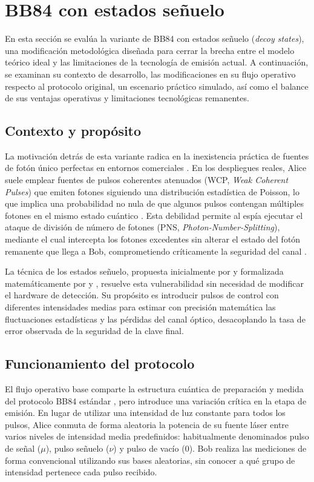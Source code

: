 \section{BB84 con estados señuelo}

En esta sección se evalúa la variante de BB84 con estados señuelo (\emph{decoy states}), una modificación metodológica diseñada para cerrar la brecha entre el modelo teórico ideal y las limitaciones de la tecnología de emisión actual. A continuación, se examinan su contexto de desarrollo, las modificaciones en su flujo operativo respecto al protocolo original, un escenario práctico simulado, así como el balance de sus ventajas operativas y limitaciones tecnológicas remanentes.

\subsection{Contexto y propósito}
La motivación detrás de esta variante radica en la inexistencia práctica de fuentes de fotón único perfectas en entornos comerciales \citep{gisin2002, lo2014}. En los despliegues reales, Alice suele emplear fuentes de pulsos coherentes atenuados (WCP, \emph{Weak Coherent Pulses}) que emiten fotones siguiendo una distribución estadística de Poisson, lo que implica una probabilidad no nula de que algunos pulsos contengan múltiples fotones en el mismo estado cuántico \citep{lutkenhaus2002}. Esta debilidad permite al espía ejecutar el ataque de división de número de fotones (PNS, \emph{Photon-Number-Splitting}), mediante el cual intercepta los fotones excedentes sin alterar el estado del fotón remanente que llega a Bob, comprometiendo críticamente la seguridad del canal \citep{brassard2000pns}. 

La técnica de los estados señuelo, propuesta inicialmente por \cite{hwang2003} y formalizada matemáticamente por \cite{lo2005} y \cite{wang2005}, resuelve esta vulnerabilidad sin necesidad de modificar el hardware de detección. Su propósito es introducir pulsos de control con diferentes intensidades medias para estimar con precisión matemática las fluctuaciones estadísticas y las pérdidas del canal óptico, desacoplando la tasa de error observada de la seguridad de la clave final.

\subsection{Funcionamiento del protocolo}
El flujo operativo base comparte la estructura cuántica de preparación y medida del protocolo BB84 estándar \citep{bennett1984, scarani2009}, pero introduce una variación crítica en la etapa de emisión. En lugar de utilizar una intensidad de luz constante para todos los pulsos, Alice conmuta de forma aleatoria la potencia de su fuente láser entre varios niveles de intensidad media predefinidos: habitualmente denominados pulso de señal ($\mu$), pulso señuelo ($\nu$) y pulso de vacío ($0$). Bob realiza las mediciones de forma convencional utilizando sus bases aleatorias, sin conocer a qué grupo de intensidad pertenece cada pulso recibido.


